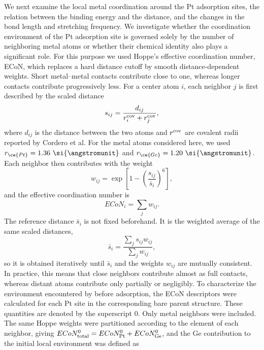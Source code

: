 We next examine the local metal coordination around the Pt adsorption sites,
the relation between the binding energy and the  distance, and the
changes in the  bond length and stretching frequency.
We investigate whether the coordination environment of the Pt adsorption site is governed solely by the number of neighboring metal atoms or whether their chemical identity also plays a significant role. For this purpose we used Hoppe's
effective coordination number, ECoN,\cite{hoppe:econ:1979} which replaces a hard distance cutoff by
smooth distance-dependent weights. {Short metal--metal contacts
contribute close to one, whereas longer contacts contribute progressively
less.} For a
center atom \(i\), each neighbor \(j\) is first described by the scaled
distance
\begin{equation}
s_{ij}=\frac{d_{ij}}{r_i^{\rm cov}+r_j^{\rm cov}},
\end{equation}
where \(d_{ij}\) is the distance between the two atoms and \(r^{\rm cov}\) are
covalent radii reported by Cordero et al.\cite{cordero:covalent-radii:2008}
For the metal atoms considered here, we used
\(r_{\ce{Pt}}=1.36~\si{\angstromunit}\) and \(r_{\ce{Ge}}=1.20~\si{\angstromunit}\).
Each neighbor then contributes with the weight
\begin{equation}
w_{ij}=\exp\left[1-\left(\frac{s_{ij}}{\bar{s}_i}\right)^6\right],
\end{equation}
and the effective coordination number is
\begin{equation}
ECoN_i=\sum_j w_{ij}.
\end{equation}
The reference distance \(\bar{s}_i\) is not fixed beforehand. It is the
weighted average of the same scaled distances,
\begin{equation}
\bar{s}_i=\frac{\sum_j s_{ij}w_{ij}}{\sum_j w_{ij}},
\end{equation}
so it is obtained iteratively until \(\bar{s}_i\) and the weights \(w_{ij}\)
are mutually consistent. In practice, this means that close neighbors
contribute almost as full contacts, whereas distant atoms contribute only
partially or negligibly. To characterize the environment encountered by
 before adsorption, the ECoN descriptors were calculated for each Pt
site in the corresponding bare parent structure. These quantities are denoted
by the superscript 0. Only metal neighbors were included. The same Hoppe
weights were partitioned according to the element of each neighbor, giving
$ECoN_{\rm total}^{0}=ECoN_{\rm Pt}^{0}+ECoN_{\rm Ge}^{0}$, and the Ge
contribution to the initial local environment was defined as
